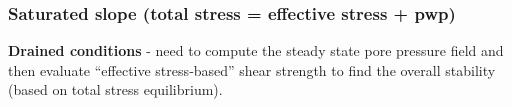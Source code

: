 \documentclass[notes]{beamer}
\begin{document}
\begin{frame}
\frametitle{Saturated slope (total stress = effective stress + pwp)}
\textbf{Drained conditions} - need to compute the steady state pore pressure field
and then evaluate ``effective stress‐based'' shear strength to find the overall
stability (based on total stress equilibrium).
\end{frame}
\end{document}

